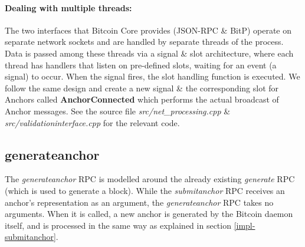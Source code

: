 \paragraph{Dealing with multiple threads:} 
The two interfaces that Bitcoin Core provides (JSON-RPC \& BitP) operate on separate network sockets and are handled by separate threads of the process. 
Data is passed among these threads via a signal \& slot architecture, where each thread has handlers that listen on pre-defined slots, waiting for an event (a signal) to occur. When the signal fires, the slot handling function is executed.
We follow the same design and create a new signal \& the corresponding slot for Anchors called \textbf{AnchorConnected} which performs the actual broadcast of Anchor messages.
See the source file \textit{src/net\_processing.cpp} \& \textit{src/validationinterface.cpp} for the relevant code.


\subsection{generateanchor} \label{impl-generateanchor}

The \textit{generateanchor} RPC is modelled around the already existing \textit{generate} RPC (which is used to generate a block). 
While the \textit{submitanchor} RPC receives an anchor's representation as an argument, the \textit{generateanchor} RPC takes no arguments. When it is called, a new anchor is generated by the Bitcoin daemon itself, and is processed in the same way as explained in section \ref{impl-submitanchor}.
